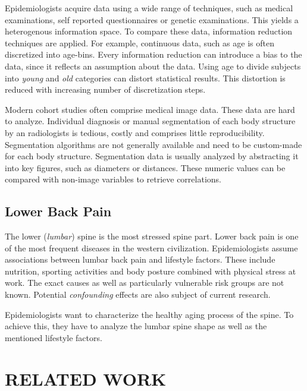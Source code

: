 \documentclass[a4paper,twoside]{style/article}
\begin{document}
Epidemiologists acquire data using a wide range of techniques, such as medical examinations, self reported questionnaires or genetic examinations.
This yields a heterogenous information space.
To compare these data, information reduction techniques are applied.
For example, continuous data, such as age is often discretized into age-bins.
Every information reduction can introduce a bias to the data, since it reflects an assumption about the data.
Using age to divide subjects into \emph{young} and \emph{old} categories can distort statistical results.
This distortion is reduced with increasing number of discretization steps.

Modern cohort studies often comprise medical image data.
These data are hard to analyze.
Individual diagnosis or manual segmentation of each body structure by an radiologists is tedious, costly and comprises little reproducibility.
Segmentation algorithms are not generally available and need to be custom-made for each body structure.
Segmentation data is usually analyzed by abstracting it into key figures, such as diameters or distances.
These numeric values can be compared with non-image variables to retrieve correlations.
\subsection{Lower Back Pain}
The lower (\emph{lumbar}) spine is the most stressed spine part.
Lower back pain is one of the most frequent diseases in the western civilization.
Epidemiologists assume associations between lumbar back pain and lifestyle factors.
These include nutrition, sporting activities and body posture combined with physical stress at work.
The exact causes as well as particularly vulnerable risk groups are not known.
Potential \emph{confounding} effects are also subject of current research.

Epidemiologists want to characterize the healthy aging process of the spine.
To achieve this, they have to analyze the lumbar spine shape as well as the mentioned lifestyle factors.
\section{\uppercase{Related Work}}
\label{sec:RelatedWork}
\end{document}
